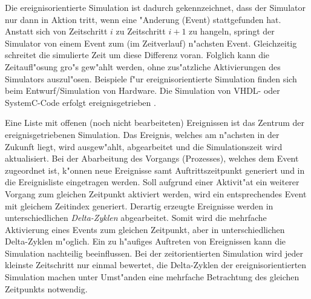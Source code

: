Die ereignisorientierte Simulation ist dadurch gekennzeichnet, dass der
Simulator nur dann in Aktion tritt, wenn eine "Anderung (Event) stattgefunden hat. Anstatt
sich von Zeitschritt $i$ zu Zeitschritt $i+1$ zu hangeln, springt der   %
Simulator von einem Event zum (im Zeitverlauf) n"achsten Event. Gleichzeitig
schreitet die simulierte Zeit um diese Differenz voran. Folglich kann die
Zeitaufl"osung gro"s gew"ahlt werden, ohne zus"atzliche Aktivierungen des
Simulators auszul"osen. Beispiele f"ur ereignisorientierte Simulation finden sich beim
Entwurf/Simulation von Hardware. Die Simulation von VHDL- oder SystemC-Code
erfolgt ereignisgetrieben \cite{glms:2002, sysc1}. 

Eine Liste mit offenen (noch nicht bearbeiteten) Ereignissen ist das Zentrum der
ereignisgetriebenen Simulation. Das Ereignis, welches am n"achsten in der Zukunft
liegt, wird ausgew"ahlt, abgearbeitet und die Simulationszeit wird
aktualisiert. Bei der Abarbeitung des Vorgangs (Prozesses), welches dem Event
zugeordnet ist, k"onnen neue Ereignisse samt Auftrittszeitpunkt generiert und
in die Ereignisliste eingetragen werden. Soll aufgrund einer Aktivit"at ein weiterer
Vorgang zum gleichen Zeitpunkt aktiviert werden, wird ein entsprechendes Event
mit gleichem Zeitindex generiert. Derartig erzeugte Ereignisse werden in
unterschiedlichen \emph{Delta-Zyklen} abgearbeitet. Somit wird die mehrfache
Aktivierung eines Events zum gleichen Zeitpunkt, aber in unterschiedlichen
Delta-Zyklen m"oglich. Ein zu h"aufiges Auftreten von Ereignissen kann die
Simulation nachteilig beeinflussen. Bei der zeitorientierten Simulation wird
jeder kleinste Zeitschritt nur einmal bewertet, die Delta-Zyklen der
ereignisorientierten Simulation machen unter
Umst"anden eine mehrfache Betrachtung des gleichen Zeitpunkts notwendig.

